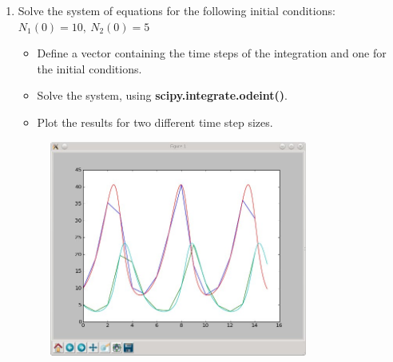 \documentclass[smallheadings,12pt]{scrartcl}
\begin{document}
\begin{enumerate}
  \item Solve the system of equations for the following initial conditions:\\ $N_1(0) = 10,\:N_2(0) = 5$
    \begin{itemize}
      \item Define a vector containing the time steps of the integration and one for the initial conditions.
      \item Solve the system, using \textbf{scipy.integrate.odeint()}.
      \item Plot the results for two different time step sizes.
    \end{itemize}
\begin{figure}[H]
  \centering
  \includegraphics[width=0.8\textwidth]{pics/LottkaVoltera.png}
\end{figure}

\end{enumerate}
\end{document}
